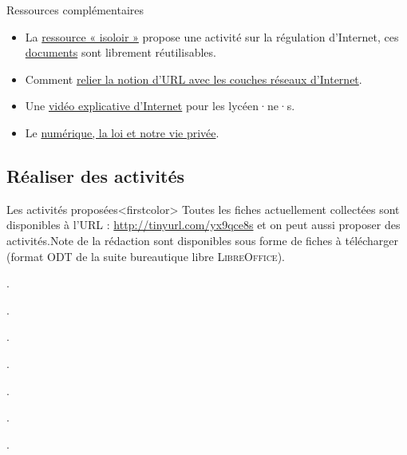 \begin{gofurther}{Ressources complémentaires}
\vspace{2pt}
\begin{itemize}\jazzitem
\item La \href{https://www.isoloir.net/}{ressource « isoloir »} propose une activité sur la régulation d'Internet, ces \href{https://pixees.fr/informatique-et-societe-du-jeu-serieux-au-document-pedagogique/}{documents} sont librement réutilisables.
\item Comment \href{http://www.adjectif.net/spip/spip.php?article294}{relier la notion d'URL avec les couches réseaux d'Internet}.
\item Une \href{https://www.isoloir.net/documents01/videos/ISOLOIR_CN_ALL_Trala01_ok_Bases.mp4}{vidéo explicative d'Internet} pour les lycéen·ne·s.
\item Le \href{https://pixees.fr/le-numerique-la-loi-et-notre-vie-privee-2/}{numérique, la loi et notre vie privée}.
\end{itemize}
\end{gofurther}


\subsection[Réaliser des activités]{Réaliser des activités}
\label{sub:IX.1.2}


Les activités proposées\caution[t]<firstcolor>{%
Toutes les fiches actuellement collectées sont disponibles à l'URL : \url{http://tinyurl.com/yx9qce8s} et on peut aussi proposer des activités.}{Note de la rédaction}
sont disponibles sous forme de fiches à télécharger (format ODT de la suite bureautique libre \textsc{LibreOffice}).

\begin{jazzitemize}
\item {}.
\item {}.
\item {}.
\item {}.
\item {}.
\item {}.
\item {}.
\end{jazzitemize}

